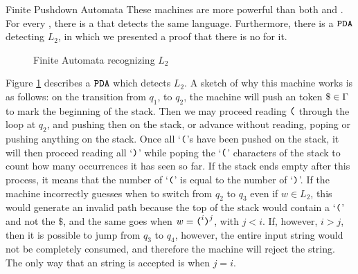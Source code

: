 \begin{section}{Finite Pushdown Automata}
These machines are more powerful than both  and .
For every , there is a  that detects the same language.
Furthermore, there is a $\texttt{PDA}$ detecting $L_2$, in
which we presented a proof that there is no  for it.

\begin{figure}

\caption{Finite Automata recognizing $L_2$}
\label{fig:pda_l2}
\end{figure}

Figure \ref{fig:pda_l2} describes a $\texttt{PDA}$ which detects $L_2$.
A sketch of why this machine works is as follows: on the transition
from $q_1$, to $q_2$, the machine will push an token $\$ \in \Gamma$ to mark the
beginning of the stack. Then we may proceed reading $\texttt{(}$ through the loop
at $q_2$, and pushing then on the stack, or advance without reading, poping or
pushing anything on the stack.  Once all `$\texttt{(}$'s have been pushed on the
stack, it will then proceed reading all `$\texttt{)}$' while poping the `$\texttt{(}$'
characters of the stack to count how many occurrences it has seen so far.
If the stack ends empty after this process, it means that the number of `$\texttt{(}$'
is equal to the number of `$\texttt{)}$'. If the machine incorrectly guesses when to switch
from $q_2$ to $q_3$ even if $w \in L_2$, this would generate an invalid path
because the top of the stack would contain a `$\texttt{(}$' and not the $\$$, and
the same goes when $w = \texttt{(}^i\texttt{)}^j$, with $j < i$. If, however, $i >
j$, then it is possible to jump from $q_3$ to $q_4$, however, the entire input string
would not be completely consumed, and therefore the machine will reject the
string. The only way that an string is accepted is when $j = i$.


\end{section}
